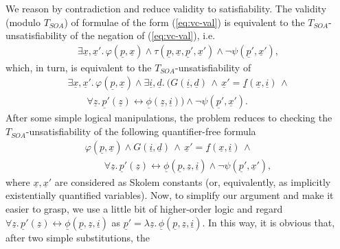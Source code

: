 \documentclass[conference]{IEEEtran}
\begin{document}
\begin{LONG}
\begin{IEEEproof}
  We reason by contradiction and reduce validity to satisfiability.
  The validity (modulo $T_\mathit{SOA}$) of formulae of the form
  (\ref{eq:vc-val}) is equivalent to the $T_\mathit{SOA}$-unsatisfiability of
  the negation of (\ref{eq:vc-val}), i.e.
  \begin{eqnarray*}
    \exists \underline{x},\underline{x}'.\,
    \varphi(\underline{p},\underline{x}) \wedge
    \tau(\underline{p},\underline{x},\underline{p}',\underline{x}') 
    \wedge
    \neg \psi(\underline{p}',\underline{x}') ,
  \end{eqnarray*}
  which, in turn, is equivalent to the $T_\mathit{SOA}$-unsatisfiability of
  \begin{multline*}
    \exists \underline{x},\underline{x}'.\,
    \varphi(\underline{p},\underline{x}) \wedge
    \exists \underline{i},\underline{d}.\ (
    G(\underline{i}, \underline{d}) \,\wedge\,
    \underline{x}' = \underline{f}(\underline{x}, \underline{i}) \,\wedge\\
    \qquad \forall \underline{z}.\, \underline{p}'(\underline{z}) \leftrightarrow
    \underline{\phi}(\underline{z}, \underline{i}) )
    \wedge
    \neg \psi(\underline{p}',\underline{x}') .
  \end{multline*}
  After some simple logical manipulations, the problem reduces to
  checking the $T_\mathit{SOA}$-unsatisfiability of the following
  quantifier-free formula
  \begin{multline*}
    \varphi(\underline{p},\underline{x}) \wedge
    G(\underline{i}, \underline{d}) \,\wedge\,
    \underline{x}' = \underline{f}(\underline{x}, \underline{i}) \,\wedge\\
    \qquad
    \forall \underline{z}.\, \underline{p}'(\underline{z}) \leftrightarrow
    \underline{\phi}(\underline{p}, \underline{z}, \underline{i}) 
    \wedge
    \neg \psi(\underline{p}',\underline{x}') ,
  \end{multline*}
  where $\underline{x},\underline{x}'$ are considered as Skolem
  constants (or, equivalently, as implicitly existentially quantified
  variables).  Now, to simplify our argument and make it easier to
  grasp, we use a little bit of higher-order logic and regard $\forall
  \underline{z}.\, \underline{p}'(\underline{z}) \leftrightarrow
  \underline{\phi}(\underline{p},\underline{z},\underline{i})$ as
  $\underline{p}' = \lambda
  \underline{z}.\, \underline{\phi}(\underline{p},\underline{z},\underline{i})$.
  In this way, it is obvious that, after two simple substitutions, the

\end{IEEEproof}
\end{LONG}
\end{document}
